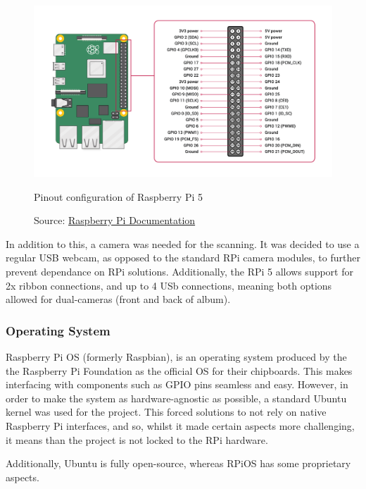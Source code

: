                 \begin{figure}[htbp]
                    \centering
                    \includegraphics[width=\linewidth]{images/raspberry-pi-5-pinout.png}
                    \caption{Pinout configuration of Raspberry Pi 5}
                    \label{fig:RPi5Pinout}
                    \caption*{Source: \href{https://www.raspberrypi.com/documentation/computers/raspberry-pi.html#gpio}{Raspberry Pi Documentation}}
                \end{figure}
    
                In addition to this, a camera was needed for the scanning. It was decided to use a regular USB webcam, as opposed to the standard RPi camera modules, to further prevent dependance on RPi solutions. Additionally, the RPi 5 allows support for 2x ribbon connections, and up to 4 USb connections, meaning both options allowed for dual-cameras (front and back of album).
    
            \subsubsection{Operating System}
    
                Raspberry Pi OS (formerly Raspbian), is an operating system produced by the the Raspberry Pi Foundation as the official OS for their chipboards. This makes interfacing with components such as GPIO pins seamless and easy. However, in order to make the system as hardware-agnostic as possible, a standard Ubuntu kernel was used for the project. This forced solutions to not rely on native Raspberry Pi interfaces, and so, whilst it made certain aspects more challenging, it means than the project is not locked to the RPi hardware.
    
                Additionally, Ubuntu is fully open-source, whereas RPiOS has some proprietary aspects.
    
